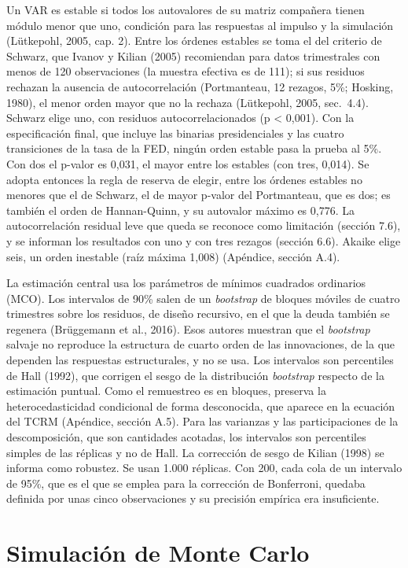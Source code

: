 Un VAR es estable si todos los autovalores de su matriz compañera tienen
módulo menor que uno, condición para las respuestas al impulso y la
simulación (Lütkepohl, 2005, cap. 2). Entre los órdenes estables se toma
el del criterio de Schwarz, que Ivanov y Kilian (2005) recomiendan para
datos trimestrales con menos de 120 observaciones (la muestra efectiva
es de 111); si sus residuos rechazan la ausencia de autocorrelación
(Portmanteau, 12 rezagos, 5\%; Hosking, 1980), el menor orden mayor que
no la rechaza (Lütkepohl, 2005, sec.~4.4). Schwarz elige uno, con
residuos autocorrelacionados (p \textless{} 0,001). Con la
especificación final, que incluye las binarias presidenciales y las
cuatro transiciones de la tasa de la FED, ningún orden estable pasa la
prueba al 5\%. Con dos el p-valor es 0,031, el mayor entre los estables
(con tres, 0,014). Se adopta entonces la regla de reserva de elegir,
entre los órdenes estables no menores que el de Schwarz, el de mayor
p-valor del Portmanteau, que es dos; es también el orden de
Hannan-Quinn, y su autovalor máximo es 0,776. La autocorrelación
residual leve que queda se reconoce como limitación (sección 7.6), y se
informan los resultados con uno y con tres rezagos (sección 6.6). Akaike
elige seis, un orden inestable (raíz máxima 1,008) (Apéndice, sección
A.4).

La estimación central usa los parámetros de mínimos cuadrados ordinarios
(MCO). Los intervalos de 90\% salen de un \emph{bootstrap} de bloques
móviles de cuatro trimestres sobre los residuos, de diseño recursivo, en
el que la deuda también se regenera (Brüggemann et al., 2016). Esos
autores muestran que el \emph{bootstrap} salvaje no reproduce la
estructura de cuarto orden de las innovaciones, de la que dependen las
respuestas estructurales, y no se usa. Los intervalos son percentiles de
Hall (1992), que corrigen el sesgo de la distribución \emph{bootstrap}
respecto de la estimación puntual. Como el remuestreo es en bloques,
preserva la heterocedasticidad condicional de forma desconocida, que
aparece en la ecuación del TCRM (Apéndice, sección A.5). Para las
varianzas y las participaciones de la descomposición, que son cantidades
acotadas, los intervalos son percentiles simples de las réplicas y no de
Hall. La corrección de sesgo de Kilian (1998) se informa como robustez.
Se usan 1.000 réplicas. Con 200, cada cola de un intervalo de 95\%, que
es el que se emplea para la corrección de Bonferroni, quedaba definida
por unas cinco observaciones y su precisión empírica era insuficiente.

\section{Simulación de Monte Carlo}

